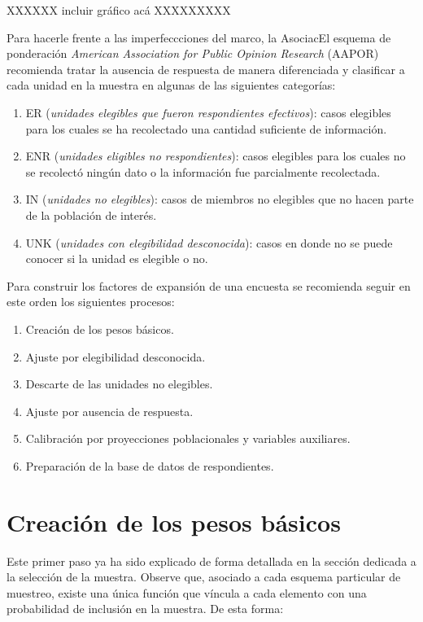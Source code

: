 \documentclass[
  10pt,
  spanish,
]{book}
\providecommand{\tightlist}{%
  \setlength{\itemsep}{0pt}\setlength{\parskip}{0pt}}
\begin{document}
XXXXXX incluir gráfico acá XXXXXXXXX

Para hacerle frente a las imperfeccciones del marco, la AsociacEl esquema de ponderación \emph{American Association for Public Opinion Research} (AAPOR) recomienda tratar la ausencia de respuesta de manera diferenciada y clasificar a cada unidad en la muestra en algunas de las siguientes categorías:

\begin{enumerate}
\def\labelenumi{\arabic{enumi}.}
\tightlist
\item
  ER (\emph{unidades elegibles que fueron respondientes efectivos}): casos elegibles para los cuales se ha recolectado una cantidad suficiente de información.
\item
  ENR (\emph{unidades eligibles no respondientes}): casos elegibles para los cuales no se recolectó ningún dato o la información fue parcialmente recolectada.
\item
  IN (\emph{unidades no elegibles}): casos de miembros no elegibles que no hacen parte de la población de interés.
\item
  UNK (\emph{unidades con elegibilidad desconocida}): casos en donde no se puede conocer si la unidad es elegible o no.
\end{enumerate}

Para construir los factores de expansión de una encuesta se recomienda seguir en este orden los siguientes procesos:

\begin{enumerate}
\def\labelenumi{\arabic{enumi}.}
\tightlist
\item
  Creación de los pesos básicos.
\item
  Ajuste por elegibilidad desconocida.
\item
  Descarte de las unidades no elegibles.
\item
  Ajuste por ausencia de respuesta.
\item
  Calibración por proyecciones poblacionales y variables auxiliares.
\item
  Preparación de la base de datos de respondientes.
\end{enumerate}

\hypertarget{creaciuxf3n-de-los-pesos-buxe1sicos}{%
\section{Creación de los pesos básicos}\label{creaciuxf3n-de-los-pesos-buxe1sicos}}

Este primer paso ya ha sido explicado de forma detallada en la sección dedicada a la selección de la muestra. Observe que, asociado a cada esquema particular de muestreo, existe una única función que víncula a cada elemento con una probabilidad de inclusión en la muestra. De esta forma:
\end{document}
